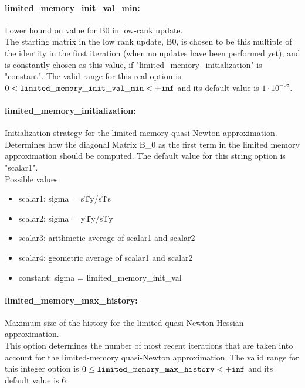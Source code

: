 \paragraph{limited\_memory\_init\_val\_min:}\label{sec:limited_memory_init_val_min} Lower bound on value for B0 in low-rank update. $\;$ \\
 The starting matrix in the low rank update, B0,
is chosen to be this multiple of the identity in
the first iteration (when no updates have been
performed yet), and is constantly chosen as this
value, if "limited\_memory\_initialization" is
"constant". The valid range for this real option is 
$0 <  {\tt limited\_memory\_init\_val\_min } <  {\tt +inf}$
and its default value is $1 \cdot 10^{-08}$.


\paragraph{limited\_memory\_initialization:}\label{sec:limited_memory_initialization} Initialization strategy for the limited memory quasi-Newton approximation. $\;$ \\
 Determines how the diagonal Matrix B\_0 as the
first term in the limited memory approximation
should be computed.
The default value for this string option is "scalar1".
\\ 
Possible values:
\begin{itemize}
   \item scalar1: sigma = s\^Ty/s\^Ts
   \item scalar2: sigma = y\^Ty/s\^Ty
   \item scalar3: arithmetic average of scalar1 and scalar2
   \item scalar4: geometric average of scalar1 and scalar2
   \item constant: sigma = limited\_memory\_init\_val
\end{itemize}

\paragraph{limited\_memory\_max\_history:}\label{sec:limited_memory_max_history} Maximum size of the history for the limited quasi-Newton Hessian approximation. $\;$ \\
 This option determines the number of most recent
iterations that are taken into account for the
limited-memory quasi-Newton approximation. The valid range for this integer option is
$0 \le {\tt limited\_memory\_max\_history } <  {\tt +inf}$
and its default value is $6$.


